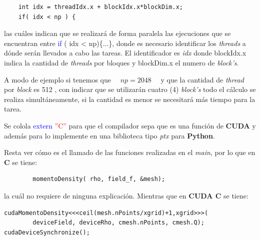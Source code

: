 {\footnotesize
	\begin{frame}{}
		\begin{lstlisting}
	int idx = threadIdx.x + blockIdx.x*blockDim.x;	
	if( idx < np ) {	
		\end{lstlisting}
		
	\end{frame}
}

las cuáles indican que se realizará de forma paralela las ejecuciones que se encuentran entre \textcolor{blue}{if} ( idx < np)\{...\}, donde es necesario identificar los \textit{threads} a dónde serán llevados a cabo las tareas. El identificador es \textit{idx} donde blockIdx.x  indica la cantidad de \textit{threads} por bloques y blockDim.x el numero de \textit{block's}.

A modo de ejemplo si tenemos que $\quad np = 2048 \quad$ y que la cantidad de \textit{thread} por \textit{block} es 512 \cite{zone2020cuda}, con indicar que se utilizarán cuatro (4) \textit{block's} todo el cálculo se realiza simultáneamente, si la cantidad es menor se necesitará más tiempo para la tarea.

Se colola \textcolor{blue}{extern} \textcolor{red}{''C''} para que el compilador sepa que es una función de \textbf{CUDA} y además para lo implemente en una biblioteca tipo \textit{ptx} para \textbf{Python}.

Resta ver cómo es el llamado de las funciones realizadas en el \textit{main}, por lo que en \textbf{C} se tiene:


{\footnotesize
	\begin{frame}{}
		\begin{lstlisting}
		momentoDensity( rho, field_f, &mesh);
		\end{lstlisting}
		
	\end{frame}
}

la cuál no requiere de ninguna explicación. Mientras que en \textbf{CUDA C} se tiene:


{\footnotesize
	\begin{frame}{}
		\begin{lstlisting}
cudaMomentoDensity<<<ceil(mesh.nPoints/xgrid)+1,xgrid>>>(
 		deviceField, deviceRho, cmesh.nPoints, cmesh.Q);  
cudaDeviceSynchronize();

		\end{lstlisting}
		
	\end{frame}
}

